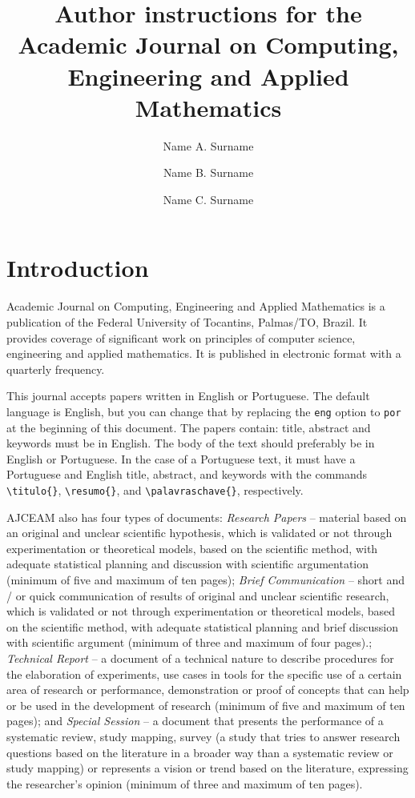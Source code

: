 \documentclass[eng]{ajceam-class}
\title{Author instructions for the Academic Journal on Computing, Engineering and Applied Mathematics}
\author[1]{Name A. Surname}
\author[2]{Name B. Surname}
\author[1,2,3]{Name C. Surname}
\affil[1]{University Name, Department Name or Institute, State, Country}
\affil[2]{(Other) University Name, Department Name or Institute, State, Country}
\affil[3]{(Other) University Name, Department Name or Institute, State, Country}
\begin{document}
\maketitle
\thispagestyle{fancy}
\printcontactdata

\section{Introduction}
Academic Journal on Computing, Engineering and Applied Mathematics is a publication of the Federal University of Tocantins, Palmas/TO, Brazil. It provides coverage of significant work on principles  of computer science, engineering and applied mathematics. It is published in electronic format with a quarterly frequency.

This journal accepts papers written in English or Portuguese. The default language is English, but you can change that by replacing the \texttt{eng} option to \texttt{por} at the beginning of this document. The papers contain: title, abstract and keywords must be in English. The body of the text should preferably be in English or Portuguese. In the case of a Portuguese text, it must have a Portuguese and English title, abstract, and keywords with the commands \verb|\titulo{}|, \verb|\resumo{}|, and \verb|\palavraschave{}|, respectively.

AJCEAM also has four types of documents: \textit{Research Papers} -- material based on an original and unclear scientific hypothesis, which is validated or not through experimentation or theoretical models, based on the scientific method, with adequate statistical planning and discussion with scientific argumentation (minimum of five and maximum of ten pages); \textit{Brief Communication} -- short and / or quick communication of results of original and unclear scientific research, which is validated or not through experimentation or theoretical models, based on the scientific method, with adequate statistical planning and brief discussion with scientific argument (minimum of three and maximum of four pages).; \textit{Technical Report} -- a document of a technical nature to describe procedures for the elaboration of experiments, use cases in tools for the specific use of a certain area of research or performance, demonstration or proof of concepts that can help or be used in the development of research (minimum of five and maximum of ten pages); and \textit{Special Session} -- a document that presents the performance of a systematic review, study mapping, survey (a study that tries to answer research questions based on the literature in a broader way than a systematic review or study mapping) or represents a vision or trend based on the literature, expressing the researcher's opinion (minimum of three and maximum of ten pages).
\end{document}
